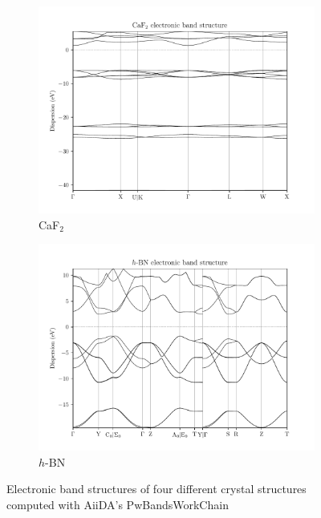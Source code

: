 \begin{figure}
\begin{subfigure}{.5\textwidth}
  \includegraphics[width=.9\linewidth]{sections/images/bandstructures/CaF2_bands.pdf}
  \caption{CaF$_2$}
  \label{fig:workchain_band_structures_CaF2}
\end{subfigure}%
\begin{subfigure}{.5\textwidth}
  \centering
  \includegraphics[width=.9\linewidth]{sections/images/bandstructures/hBN_bands.pdf}
  \caption{$h$-BN}
  \label{fig:workchain_band_structures_hBN}
\end{subfigure}%
\caption{Electronic band structures of four different crystal structures computed with AiiDA's PwBandsWorkChain}
\label{fig:workchain_band_structures}
\end{figure}
